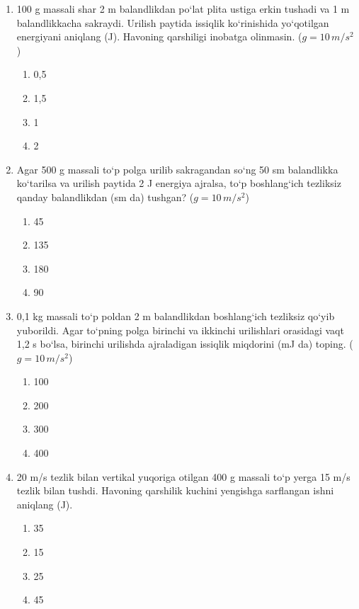\begin{enumerate}

\item 100 g massali shar 2 m balandlikdan po‘lat plita ustiga erkin tushadi va 1 m balandlikkacha sakraydi. Urilish paytida issiqlik ko‘rinishida yo‘qotilgan energiyani aniqlang (J). Havoning qarshiligi inobatga olinmasin. ($g = 10 \, m/s^2$)
\begin{enumerate}[label=\Alph*)]
\item 0,5
\item 1,5
\item 1
\item 2
\end{enumerate}

\item Agar 500 g massali to‘p polga urilib sakragandan so‘ng 50 sm balandlikka ko‘tarilsa va urilish paytida 2 J energiya ajralsa, to‘p boshlang‘ich tezliksiz qanday balandlikdan (sm da) tushgan? ($g = 10 \, m/s^2$)
\begin{enumerate}[label=\Alph*)]
\item 45
\item 135
\item 180
\item 90
\end{enumerate}

\item 0,1 kg massali to‘p poldan 2 m balandlikdan boshlang‘ich tezliksiz qo‘yib yuborildi. Agar to‘pning polga birinchi va ikkinchi urilishlari orasidagi vaqt 1,2 s bo‘lsa, birinchi urilishda ajraladigan issiqlik miqdorini (mJ da) toping. ($g = 10 \, m/s^2$)
\begin{enumerate}[label=\Alph*)]
\item 100
\item 200
\item 300
\item 400
\end{enumerate}

\item 20 m/s tezlik bilan vertikal yuqoriga otilgan 400 g massali to‘p yerga 15 m/s tezlik bilan tushdi. Havoning qarshilik kuchini yengishga sarflangan ishni aniqlang (J).
\begin{enumerate}[label=\Alph*)]
\item 35
\item 15
\item 25
\item 45
\end{enumerate}


\end{enumerate}
